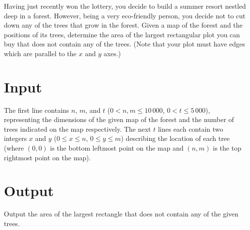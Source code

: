 
Having just recently won the lottery, you decide to build a summer resort nestled deep in a forest. However, being a very eco-friendly person, you decide not to cut down any of the trees that grow in the forest. Given a map of the forest and the positions of its trees, determine the area of the largest rectangular plot you can buy that does not contain any of the trees. (Note that your plot must have edges which are parallel to the $x$ and $y$ axes.)

\section*{Input}

The first line contains $n$, $m$, and $t$ ($0 < n, m \leq 10\,000$, $0 < t \leq 5\,000$), representing the dimensions of the given map of the forest and the number of trees indicated on the map respectively. The next $t$ lines each contain two integers $x$ and $y$ ($0 \leq x \leq n$, $0 \leq y \leq m$) describing the location of each tree (where $(0,0)$ is the bottom leftmost point on the map and $(n,m)$ is the top rightmost point on the map).

\section*{Output}
Output the area of the largest rectangle that does not contain any of the given trees.
